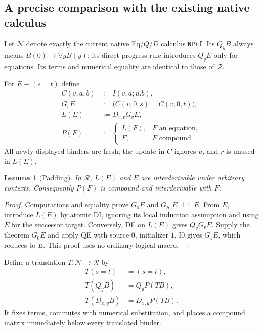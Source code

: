 \documentclass[11pt,a4paper]{article}
\newtheorem{lemma}[theorem]{Lemma}
\theoremstyle{definition}
\begin{document}
\subsection{A precise comparison with the existing native calculus}
\label{subsec:new-native-comparison}

Let $\mathcal N$ denote exactly the current native Eq/$Q$/$D$ calculus
\texttt{NPrf}.  Its $Q_yB$ always means $B(0)\to\forall yB(y)$; its direct
progress rule introduces $Q_yE$ only for equations.  Its terms and numerical
equality are identical to those of $\mathcal R$.

For $E\equiv(s=t)$ define
\begin{equation}
 \begin{aligned}
 C(v,a,b)&:=I(v,a;u.b),\\
 G_vE&:=\bigl(C(v,0,s)=C(v,0,t)\bigr),\\
 L(E)&:=D_{r,v}G_vE,\\
 P(F)&:=\begin{cases}L(F),&F\text{ an equation},\\F,&F\text{ compound}.
              \end{cases}
 \end{aligned}
 \label{eq:new-padding}
\end{equation}
All newly displayed binders are fresh; the update in $C$ ignores $u$, and
$r$ is unused in $L(E)$.

\begin{lemma}[Padding]
\label{lem:new-padding}
In $\mathcal R$, $L(E)$ and $E$ are interderivable under arbitrary contexts.
Consequently $P(F)$ is compound and interderivable with $F$.
\end{lemma}
\begin{proof}
Computations and equality prove $G_0E$ and
$G_{Sz}E\dashv\vdash E$.  From $E$, introduce $L(E)$ by atomic DI, ignoring
its local induction assumption and using $E$ for the successor target.
Conversely, DE on $L(E)$ gives $Q_vG_vE$.  Supply the theorem $G_0E$ and
apply QE with source $0$, initializer $1$.  I0 gives $G_1E$, which reduces
to $E$.  This proof uses no ordinary logical macro.
\end{proof}

Define a translation $T:\mathcal N\to\mathcal R$ by
\begin{equation}
 \begin{aligned}
 T(s=t)&=(s=t),\\
 T(Q_yB)&=Q_yP(TB),\\
 T(D_{x,y}B)&=D_{x,y}P(TB).
 \end{aligned}
 \label{eq:new-T}
\end{equation}
It fixes terms, commutes with numerical substitution, and places a compound
matrix immediately below every translated binder.
\end{document}
